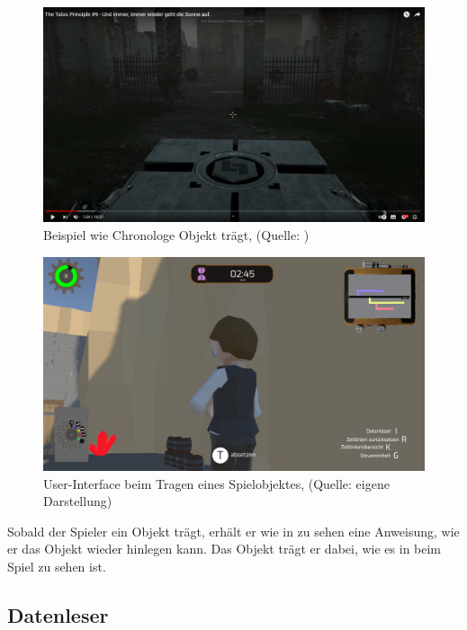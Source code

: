 \begin{figure}[ht]
\centering
\includegraphics[width=1\linewidth]{content/pictures/ObjectInArm.jpg}
\caption{Beispiel wie Chronologe Objekt trägt, (Quelle: \cite{gametube_talos_2014})}
\label{fig:carry_object_objectarm}
\end{figure}

\begin{figure}[ht]
\centering
\includegraphics[width=1\linewidth]{content/pictures/CarryObjects.jpg}
\caption{User-Interface beim Tragen eines Spielobjektes, (Quelle: eigene Darstellung)}
\label{fig:carry_object_ui}
\end{figure}

Sobald der Spieler ein Objekt trägt, erhält er wie in  zu sehen eine Anweisung, wie er das Objekt wieder hinlegen kann. Das Objekt trägt er dabei, wie es in  beim Spiel  zu sehen ist.


\subsection{Datenleser}\label{sec:datenleser_ui}

